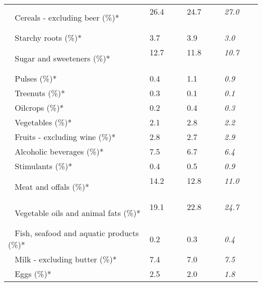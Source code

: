 \begin{tabular}{L{3.9cm} R{1cm} R{1cm} R{1cm}}
	 ~ Cereals - excluding beer (\%)* & 26.4 ~ \ \ & 24.7 ~ \ \ & \textit{27.0} ~ \ \ \\ 
	 ~ Starchy roots (\%)* & 3.7 ~ \ \ & 3.9 ~ \ \ & \textit{3.0} ~ \ \ \\ 
	 ~ Sugar and sweeteners (\%)* & 12.7 ~ \ \ & 11.8 ~ \ \ & \textit{10.7} ~ \ \ \\ 
	 ~ Pulses (\%)* & 0.4 ~ \ \ & 1.1 ~ \ \ & \textit{0.9} ~ \ \ \\ 
	 ~ Treenuts (\%)* & 0.3 ~ \ \ & 0.1 ~ \ \ & \textit{0.1} ~ \ \ \\ 
	 ~ Oilcrops (\%)* & 0.2 ~ \ \ & 0.4 ~ \ \ & \textit{0.3} ~ \ \ \\ 
	 ~ Vegetables (\%)* & 2.1 ~ \ \ & 2.8 ~ \ \ & \textit{2.2} ~ \ \ \\ 
	 ~ Fruits - excluding wine (\%)* & 2.8 ~ \ \ & 2.7 ~ \ \ & \textit{2.9} ~ \ \ \\ 
	 ~ Alcoholic beverages (\%)* & 7.5 ~ \ \ & 6.7 ~ \ \ & \textit{6.4} ~ \ \ \\ 
	 ~ Stimulants (\%)* & 0.4 ~ \ \ & 0.5 ~ \ \ & \textit{0.9} ~ \ \ \\ 
	 ~ Meat and offals (\%)* & 14.2 ~ \ \ & 12.8 ~ \ \ & \textit{11.0} ~ \ \ \\ 
	 ~ Vegetable oils and animal fats (\%)* & 19.1 ~ \ \ & 22.8 ~ \ \ & \textit{24.7} ~ \ \ \\ 
	 ~ Fish, seafood and aquatic products (\%)* & 0.2 ~ \ \ & 0.3 ~ \ \ & \textit{0.4} ~ \ \ \\ 
	 ~ Milk - excluding butter (\%)* & 7.4 ~ \ \ & 7.0 ~ \ \ & \textit{7.5} ~ \ \ \\ 
	 ~ Eggs (\%)* & 2.5 ~ \ \ & 2.0 ~ \ \ & \textit{1.8} ~ \ \ \\ 
       \toprule
      \end{tabular}
      \clearpage
{}
